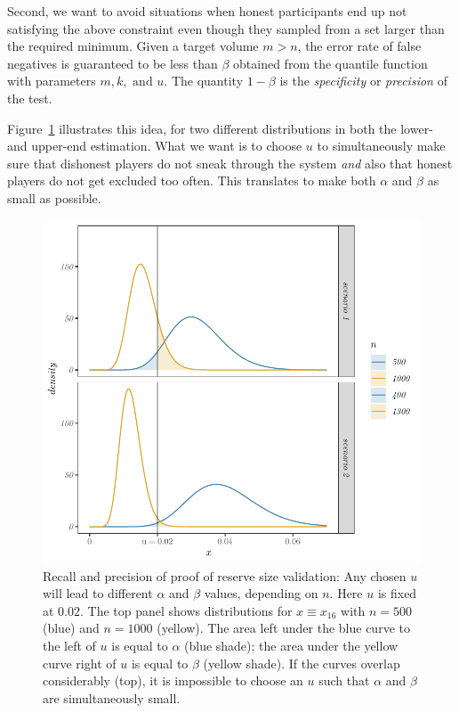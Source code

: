 Second, we want to avoid situations when honest participants end up not satisfying the above constraint even though they sampled from a set larger than the required minimum. Given a target volume $m>n$, the error rate of false negatives is guaranteed to be less than $\beta$ obtained from the quantile function with parameters $m, k, \text{ and }u$. The quantity $1-\beta$ is the \emph{specificity} or \emph{precision}
of the test.



Figure~\ref{fig-ns} illustrates this
idea, for two different distributions in both the lower- and upper-end
estimation. What we want is to choose $u$ to simultaneously make sure
that dishonest players do not sneak through the system \emph{and} also that
honest players do not get excluded too often. This translates to make both $\alpha$
and $\beta$ as small as possible. 


\begin{figure}[!ht]
  \centering
  \includegraphics[width=.7\textwidth]{fig/fig-ns-1.pdf}
  \caption[Recall and precision of proof of reserve size validation]{Recall and precision of proof of reserve size validation: Any chosen $u$ will lead to different $\alpha$ and $\beta$ values, depending on $n$. Here $u$ is fixed at $0.02$. The top panel shows distributions for $x \equiv x_{16}$ with $n = 500$ (blue) and $n = 1000$ (yellow). The area left under the blue curve to the left of $u$ is equal to $\alpha$ (blue shade); the area under the yellow curve right of $u$ is equal to $\beta$ (yellow shade). If the curves overlap considerably (top), it is impossible to choose an $u$ such that $\alpha$ and $\beta$ are simultaneously small.}
  \label{fig-ns}
\end{figure}


